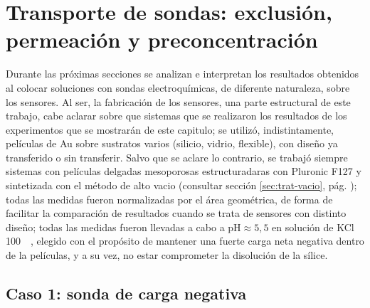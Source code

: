 	
				

\section{Transporte de sondas: exclusión, permeación y preconcentración}

	Durante las próximas secciones se analizan e interpretan los resultados obtenidos al colocar soluciones con sondas electroquímicas, de diferente naturaleza, sobre los sensores. Al ser, la fabricación de los sensores, una parte estructural de este trabajo, cabe aclarar sobre que sistemas que se realizaron los resultados de los experimentos que se mostrarán de este capitulo; se utilizó, indistintamente, películas de Au sobre sustratos varios (silicio, vidrio, flexible), con diseño ya transferido o sin transferir. Salvo que se aclare lo contrario, se trabajó siempre sistemas con películas delgadas mesoporosas estructuradaras con Pluronic F127 y sintetizada con el método de alto vacio (consultar sección \ref{sec:trat-vacio}, pág. \pageref{sec:trat-vacio}); todas las medidas fueron normalizadas por el área geométrica, de forma de facilitar la comparación de resultados cuando se trata de sensores con distinto diseño; todas las medidas fueron llevadas a cabo a $\text{pH}\approx5,5$ en solución de KCl \SI{100}{\milli\Molar}, elegido con el propósito de mantener una fuerte carga neta negativa dentro de la películas, y a su vez, no estar comprometer la disolución de la sílice.

	\subsection{Caso 1: sonda de carga negativa}

